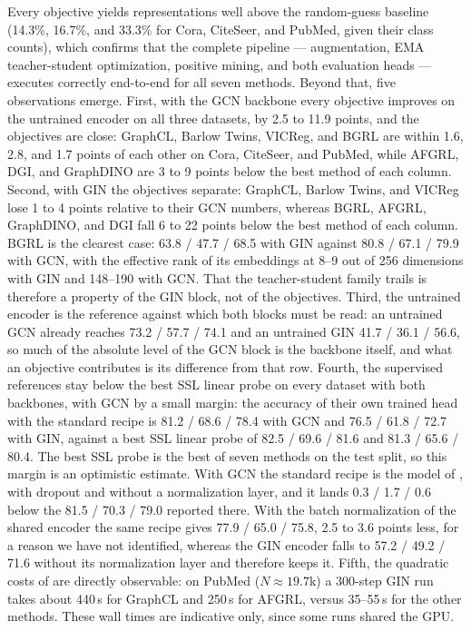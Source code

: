 \documentclass[conference]{IEEEtran}
\begin{document}
Every objective yields representations well above the random-guess baseline (14.3\%, 16.7\%, and 33.3\% for Cora, CiteSeer, and PubMed, given their class counts), which confirms that the complete pipeline --- augmentation, EMA teacher-student optimization, positive mining, and both evaluation heads --- executes correctly end-to-end for all seven methods. Beyond that, five observations emerge. First, with the GCN backbone every objective improves on the untrained encoder on all three datasets, by 2.5 to 11.9 points, and the objectives are close: GraphCL, Barlow Twins, VICReg, and BGRL are within 1.6, 2.8, and 1.7 points of each other on Cora, CiteSeer, and PubMed, while AFGRL, DGI, and GraphDINO are 3 to 9 points below the best method of each column. Second, with GIN the objectives separate: GraphCL, Barlow Twins, and VICReg lose 1 to 4 points relative to their GCN numbers, whereas BGRL, AFGRL, GraphDINO, and DGI fall 6 to 22 points below the best method of each column. BGRL is the clearest case: 63.8 / 47.7 / 68.5 with GIN against 80.8 / 67.1 / 79.9 with GCN, with the effective rank of its embeddings at 8--9 out of 256 dimensions with GIN and 148--190 with GCN. That the teacher-student family trails is therefore a property of the GIN block, not of the objectives. Third, the untrained encoder is the reference against which both blocks must be read: an untrained GCN already reaches 73.2 / 57.7 / 74.1 and an untrained GIN 41.7 / 36.1 / 56.6, so much of the absolute level of the GCN block is the backbone itself, and what an objective contributes is its difference from that row. Fourth, the supervised references stay below the best SSL linear probe on every dataset with both backbones, with GCN by a small margin: the accuracy of their own trained head with the standard recipe is 81.2 / 68.6 / 78.4 with GCN and 76.5 / 61.8 / 72.7 with GIN, against a best SSL linear probe of 82.5 / 69.6 / 81.6 and 81.3 / 65.6 / 80.4. The best SSL probe is the best of seven methods on the test split, so this margin is an optimistic estimate. With GCN the standard recipe is the model of \cite{gcn}, with dropout and without a normalization layer, and it lands 0.3 / 1.7 / 0.6 below the 81.5 / 70.3 / 79.0 reported there. With the batch normalization of the shared encoder the same recipe gives 77.9 / 65.0 / 75.8, 2.5 to 3.6 points less, for a reason we have not identified, whereas the GIN encoder falls to 57.2 / 49.2 / 71.6 without its normalization layer and therefore keeps it. Fifth, the quadratic costs of  are directly observable: on PubMed ($N \approx 19.7$k) a 300-step GIN run takes about 440\,s for GraphCL and 250\,s for AFGRL, versus 35--55\,s for the other methods. These wall times are indicative only, since some runs shared the GPU.
\end{document}
